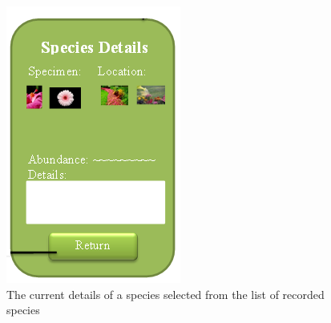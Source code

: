 \documentclass[12pt]{article}
\begin{document}
		\begin{figure}[H]
			\begin{center}
				\includegraphics[scale=0.7]{app-SpeciesDetails}
			\end{center}
			\caption{The current details of a species selected from the list of recorded species}
			\label{fig:app-speciesdetails}
		\end{figure}
\end{document}
